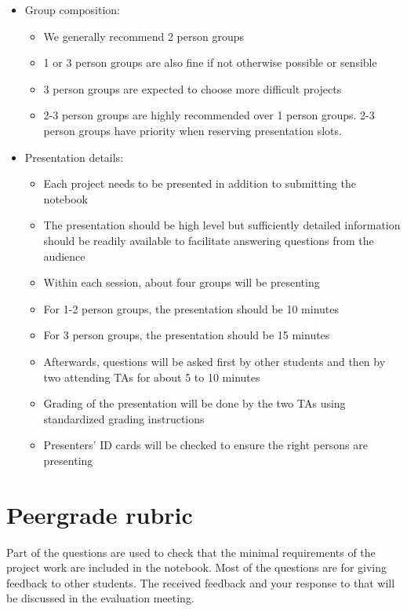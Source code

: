 \documentclass[a4paper,11pt]{article}
\begin{document}
\begin{itemize}[noitemsep,topsep=0pt]
\item Group composition:
\begin{itemize}
  \item We generally recommend 2 person groups
  \item 1 or 3 person groups are also fine if not otherwise possible or sensible
  \item 3 person groups are expected to choose more difficult projects
  \item 2-3 person groups are highly recommended over 1 person groups. 2-3 person groups have priority when reserving presentation slots.
\end{itemize}

\item Presentation details:
\begin{itemize}
  \item Each project needs to be presented in addition to submitting the notebook
  \item The presentation should be high level but sufficiently detailed information should be readily available to facilitate answering questions from the audience
  \item Within each session, about four groups will be presenting
  \item For 1-2 person groups, the presentation should be 10 minutes
  \item For 3 person groups, the presentation should be 15 minutes 
  \item Afterwards, questions will be asked first by other students and then by two attending TAs for about 5 to 10 minutes
  \item Grading of the presentation will be done by the two TAs using standardized grading instructions
  \item Presenters' ID cards will be checked to ensure the right persons are presenting
\end{itemize}

\end{itemize}

\section*{Peergrade rubric}

Part of the questions are used to check that the minimal requirements
of the project work are included in the notebook. Most of the questions are for giving
feedback to other students. The received feedback and your response to
that will be discussed in the evaluation meeting.
\end{document}
